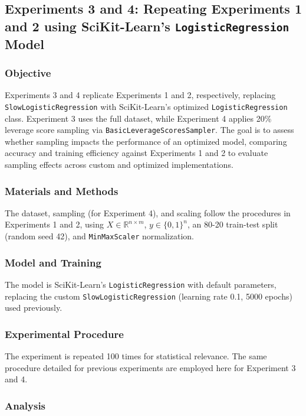 \documentclass{article}
\theoremstyle{plain}
\theoremstyle{definition}
\theoremstyle{remark}
\begin{document}
\subsection{Experiments 3 and 4: Repeating Experiments 1 and 2 using SciKit-Learn's \texttt{LogisticRegression} Model}

\subsubsection{Objective}

Experiments 3 and 4 replicate Experiments 1 and 2, respectively, replacing \texttt{SlowLogisticRegression} with SciKit-Learn's optimized \texttt{LogisticRegression} class. Experiment 3 uses the full dataset, while Experiment 4 applies 20\% leverage score sampling via \texttt{BasicLeverageScoresSampler}. The goal is to assess whether sampling impacts the performance of an optimized model, comparing accuracy and training efficiency against Experiments 1 and 2 to evaluate sampling effects across custom and optimized implementations.

\subsubsection{Materials and Methods}

The dataset, sampling (for Experiment 4), and scaling follow the procedures in Experiments 1 and 2, using $ X \in \mathbb{R}^{n \times m} $, $ y \in \{0, 1\}^n $, an 80-20 train-test split (random seed 42), and \texttt{MinMaxScaler} normalization.

\subsubsection{Model and Training}

The model is SciKit-Learn's \texttt{LogisticRegression} with default parameters, replacing the custom \texttt{SlowLogisticRegression} (learning rate 0.1, 5000 epochs) used previously.

\subsubsection{Experimental Procedure}

The experiment is repeated 100 times for statistical relevance. The same procedure detailed for previous experiments are employed here for Experiment 3 and 4.

\subsubsection{Analysis}
\end{document}
